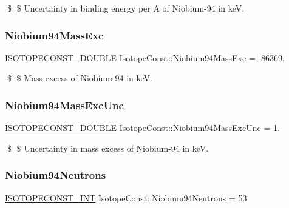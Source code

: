 \$ \$ Uncertainty in binding energy per A of Niobium-\/94 in keV. \mbox{\label{group___isotope_const-_niobium-_nb94_ga49a7ffc1ba4e16903a2a2d670d2322d7}} 
\subsubsection{\texorpdfstring{Niobium94\+Mass\+Exc}{Niobium94MassExc}}
{\footnotesize\ttfamily \mbox{\hyperlink{group___isotope_const-_macros_ga8f45a7272ce02c0b4c65c44636ed719a}{I\+S\+O\+T\+O\+P\+E\+C\+O\+N\+S\+T\+\_\+\+D\+O\+U\+B\+LE}} Isotope\+Const\+::\+Niobium94\+Mass\+Exc = -\/86369.}

\$ \$ Mass excess of Niobium-\/94 in keV. \mbox{\label{group___isotope_const-_niobium-_nb94_ga7203d0e3a584da5f5c83fe7840be36d3}} 
\subsubsection{\texorpdfstring{Niobium94\+Mass\+Exc\+Unc}{Niobium94MassExcUnc}}
{\footnotesize\ttfamily \mbox{\hyperlink{group___isotope_const-_macros_ga8f45a7272ce02c0b4c65c44636ed719a}{I\+S\+O\+T\+O\+P\+E\+C\+O\+N\+S\+T\+\_\+\+D\+O\+U\+B\+LE}} Isotope\+Const\+::\+Niobium94\+Mass\+Exc\+Unc = 1.}

\$ \$ Uncertainty in mass excess of Niobium-\/94 in keV. \mbox{\label{group___isotope_const-_niobium-_nb94_gaeea141b36411818f81e0343ac145e63c}} 
\subsubsection{\texorpdfstring{Niobium94\+Neutrons}{Niobium94Neutrons}}
{\footnotesize\ttfamily \mbox{\hyperlink{group___isotope_const-_macros_ga5f18360b3e99483a35c32d789e62621c}{I\+S\+O\+T\+O\+P\+E\+C\+O\+N\+S\+T\+\_\+\+I\+NT}} Isotope\+Const\+::\+Niobium94\+Neutrons = 53}

